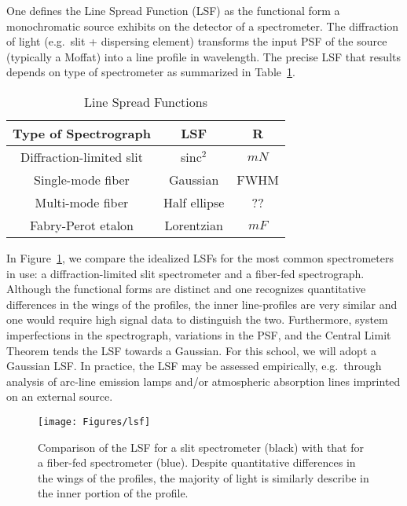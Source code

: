 \documentclass[graybox]{svmult}
\begin{document}
One defines the Line Spread Function (LSF)
as the functional form a monochromatic source exhibits 
on the detector of a spectrometer.
The diffraction of light (e.g.\ slit + dispersing element)
transforms the input PSF of the source (typically a Moffat) into a line 
profile in wavelength.  The precise 
LSF that results depends on type of spectrometer 
\cite[e.g.][]{Robertson2013} as summarized in Table~\ref{tab:LSF}.

\begin{table}[ht]
\begin{center}
\caption{{\sc Line Spread Functions}}
\label{tab:LSF}
\vskip 0.05in
\begin{tabular}{ccc}
\hline
Type of Spectrograph & LSF & R \\
\hline
Diffraction-limited slit & sinc$^2$     & $mN$ \\
Single-mode fiber        & Gaussian     & FWHM \\
Multi-mode fiber         & Half ellipse & ??\\ 
Fabry-Perot etalon       & Lorentzian   & $mF$ \\
\hline
\end{tabular}
\end{center}
\end{table}

In Figure~\ref{fig:LSF}, we compare the idealized LSFs for the
most common spectrometers in use: a diffraction-limited slit 
spectrometer and a fiber-fed spectrograph.
Although the functional forms are distinct and one recognizes
quantitative differences in the wings of the profiles,
the inner line-profiles are very similar and one would
require high signal data to distinguish the two.
Furthermore, system imperfections in the spectrograph, variations
in the PSF, and the Central Limit Theorem tends the LSF 
towards a Gaussian. For this school, we will adopt a Gaussian LSF.
In practice, the LSF may be assessed empirically, e.g.\ through
analysis of arc-line emission lamps and/or 
atmospheric absorption lines imprinted on an external source.


%
\begin{figure}[b]
\sidecaption
\texttt{[image: Figures/lsf]}
%
%
\caption{Comparison of the LSF for a slit spectrometer (black) with
that for a fiber-fed spectrometer (blue).  Despite quantitative 
differences in the wings of the profiles, the majority of light is
similarly describe in the inner portion of the profile.
}
\label{fig:LSF}       %
\end{figure}
\end{document}
